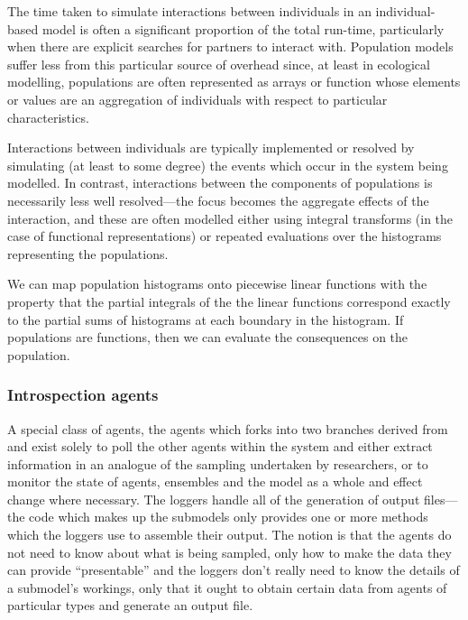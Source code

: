 The time taken to simulate interactions between individuals in an
individual-based model is often a significant proportion of the total
run-time, particularly when there are explicit searches for partners
to interact with.  Population models suffer less from this particular
source of overhead since, at least in ecological modelling,
populations are often represented as arrays or function whose elements
or values are an aggregation of individuals with respect to particular
characteristics.

Interactions between individuals are typically implemented or resolved
by simulating (at least to some degree) the events which occur in the
system being modelled. In contrast, interactions between the
components of populations is necessarily less well resolved---the
focus becomes the aggregate effects of the interaction, and these are
often modelled either using integral transforms (in the case of
functional representations) or repeated evaluations over the
histograms representing the populations.

We can map population histograms onto piecewise linear functions with
the property that the partial integrals of the the linear functions
correspond exactly to the partial sums of histograms at each boundary
in the histogram.  If populations are functions, then we can evaluate
the consequences on the population.


\subsubsection{Introspection agents}
A special class of agents, the  agents which
forks into two branches derived from   and
 exist solely to poll the other agents within the
system and either extract information in an analogue of the sampling
undertaken by researchers, or to monitor the state of agents,
ensembles and the model as a whole and effect change where
necessary. The loggers handle all of the generation of output
files---the code which makes up the submodels only provides one or more 
 methods which the loggers use to assemble their
output.  The notion is that the agents do not need to know about what
is being sampled, only how to make the data they can provide
``presentable'' and the loggers don't really need to know the details
of a submodel's workings, only that it ought to obtain certain data from
agents of particular types and generate an output file.










